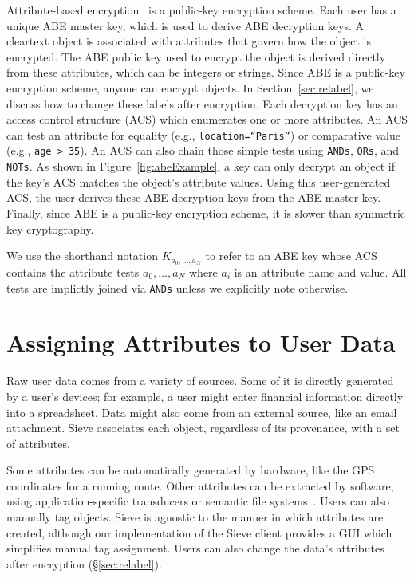 Attribute-based encryption~\cite{kpabe} is a 
public-key encryption scheme. Each
user has a unique ABE master key, which is used to derive
ABE decryption keys. 
A cleartext object is associated with attributes
that govern how the object is encrypted. 
The ABE public key used to encrypt the object is derived directly 
from these attributes, which can be integers or strings. 
Since ABE is a public-key
encryption scheme, anyone can encrypt objects. 
In Section~\ref{sec:relabel}, we discuss how to 
change these labels after encryption. Each
decryption key has an access control structure
(ACS) which enumerates one or more attributes.
An ACS can test an attribute for equality (e.g.,
\texttt{location=``Paris''}) or comparative
value (e.g., \texttt{age > 35}). An ACS can
also chain those simple tests using \texttt{ANDs},
\texttt{ORs}, and \texttt{NOTs}. As shown in
Figure~\ref{fig:abeExample}, a key can only decrypt
an object if the key's ACS matches the object's
attribute values. Using this user-generated ACS, 
the user derives these ABE decryption
keys from the ABE master key. Finally,
since ABE is a public-key encryption scheme,
it is slower than symmetric key cryptography.

We use the shorthand notation $K_{a_0,\ldots,a_N}$
to refer to an ABE key whose ACS contains the
attribute tests $a_0,\ldots,a_N$ where $a_i$ is 
an attribute name and value. All tests are
implictly joined via \texttt{ANDs} unless we
explicitly note otherwise.

\section{Assigning Attributes to User Data}
\label{sec:attrGen}

Raw user data comes from a variety of
sources. Some of it is directly generated
by a user's devices; for example, a user
might enter financial information directly into a
spreadsheet. Data might also come from an
external source, like an email attachment.
Sieve associates each object, regardless
of its provenance, with a set of attributes.

Some attributes can be automatically generated
by hardware, like the GPS coordinates for a
running route. Other attributes can be
extracted by software, using application-specific
transducers or semantic file systems~\cite{sfs,contextsfs,graphsfs}.
Users can also manually tag objects. Sieve is
agnostic to the manner in which attributes
are created, although our implementation of
the Sieve client provides a GUI which simplifies
manual tag assignment. Users can also
change the data's 
attributes after encryption (\S\ref{sec:relabel}).

